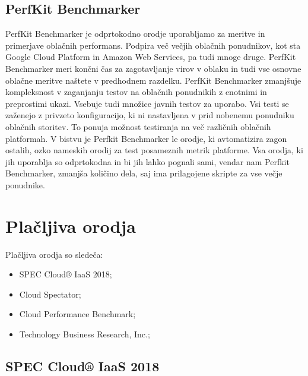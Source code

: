 \subsection{PerfKit Benchmarker}
PerfKit Benchmarker je odprtokodno orodje uporabljamo za meritve in primerjave oblačnih performans.
Podpira več večjih oblačnih ponudnikov, kot sta Google Cloud Platform in Amazon Web Services, pa tudi mnoge druge.
PerfKit Benchmarker meri končni čas za zagotavljanje virov v oblaku in tudi vse osnovne oblačne meritve naštete v predhodnem razdelku. PerfKit Benchmarker zmanjšuje kompleksnost v zaganjanju testov na oblačnih ponudnikih z enotnimi in preprostimi ukazi.
Vsebuje tudi množice javnih testov za uporabo. Vsi testi se zaženejo z privzeto konfiguracijo, ki ni nastavljena v prid nobenemu ponudniku oblačnih storitev. To ponuja možnost testiranja na več različnih oblačnih platformah.
V bistvu je Perfkit Benchmarker le orodje, ki avtomatizira zagon ostalih, ozko nameskih orodij za test posameznih metrik platforme. Vsa orodja, ki jih uporablja so odprtokodna in bi jih lahko pognali sami, vendar nam Perfkit Benchmarker, zmanjša količino dela, saj ima prilagojene skripte za vse večje ponudnike.

\section{Plačljiva orodja}
Plačljiva orodja so sledeča:
\begin{itemize}
\item SPEC Cloud® IaaS 2018;
\item Cloud Spectator;
\item Cloud Performance Benchmark;
\item Technology Business Research, Inc.;
\end{itemize}

\subsection{SPEC Cloud® IaaS 2018}


